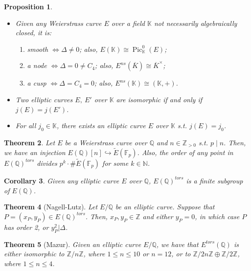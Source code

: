 \documentclass{article}
\newcommand{\numberset}{\mathbb}
\newcommand{\N}{\numberset{N}}
\newcommand{\Z}{\numberset{Z}}
\newcommand{\Q}{\numberset{Q}}
\newcommand{\K}{\numberset{K}}
\newcommand{\F}{\numberset{F}}
\DeclareMathOperator{\Pic}{Pic}
\theoremstyle{plain}
\newtheorem{thm}{Theorem}
\newtheorem{prop}[thm]{Proposition}
\newtheorem{cor}[thm]{Corollary}
\theoremstyle{definition}
\begin{document}
\begin{prop}
    \begin{itemize}
        \item Given any Weierstrass curve $E$ over a field $\K$ not necessarily
            algebraically closed, it is:\begin{enumerate}
                \item smooth $\Leftrightarrow\Delta\neq 0$; also,
                    $E(\K)\cong\Pic^0_\K(E)$;
                \item a node $\Leftrightarrow\Delta=0\neq C_4$; also,
                    $E^{ns}(\overline{K})\cong\overline{K}^\times$;
                \item a cusp $\Leftrightarrow\Delta=C_4=0$; also,
                    $E^{ns}(\K)\cong(\K,+)$.
            \end{enumerate}
        \item Two elliptic curves $E,\ E'$ over $\K$ are isomorphic if and only
            if $j(E)=j(E')$.
        \item For all $j_0\in\K$, there exists an elliptic curve $E$ over $\K$
            s.t. $j(E)=j_0$.
    \end{itemize}
\end{prop}

\begin{thm}
    Let $E$ be a Weierstrass curve over $\Q$ and $n\in\Z_{>0}$ s.t. $p\mid n$.
    Then, we have an injection $E(\Q)[n]\hookrightarrow\tilde{E}(\F_p)$. Also,
    the order of any point in $E(\Q)^{tors}$ divides
    $p^k\cdot \#\tilde{E}(\F_p)$ for some $k\in\N$.
\end{thm}

\begin{cor}
    Given any elliptic curve $E$ over $\Q$, $E(\Q)^{tors}$ is a finite subgroup
    of $E(\Q)$.
\end{cor}

\begin{thm}[Nagell-Lutz]
    Let $E/\Q$ be an elliptic curve. Suppose that $P=(x_P,y_P)\in E(\Q)^{tors}$.
    Then, $x_P,y_P\in\Z$ and either $y_P=0$, in which case $P$ has order 2, or
    $y_P^2|\Delta$.
\end{thm}

\begin{thm}[Mazur]
    Given an elliptic curve $E/\Q$, we have that $E^{tors}(\Q)$ is either
    isomorphic to $\Z/n\Z$, where $1\leq n\leq 10$ or $n=12$, or to
    $\Z/2n\Z\oplus\Z/2\Z$, where $1\leq n\leq 4$.
\end{thm}
\end{document}
